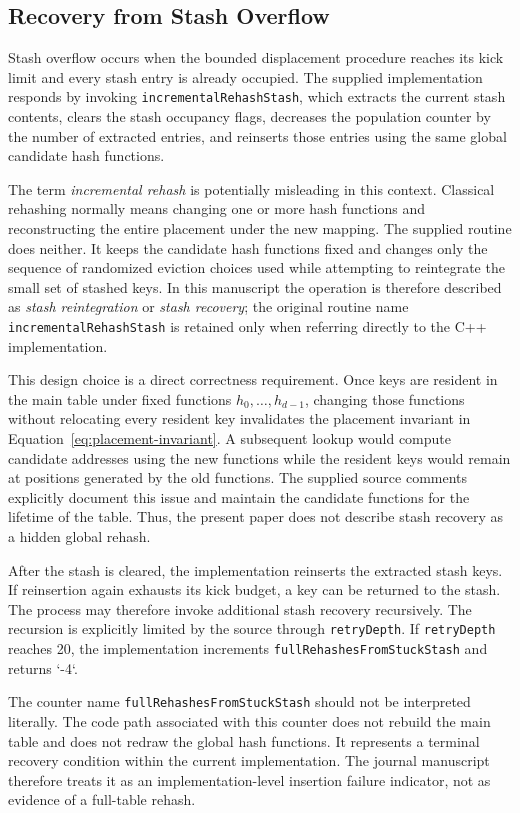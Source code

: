 \documentclass[conference]{IEEEtran}
\begin{document}
\subsection{Recovery from Stash Overflow}

Stash overflow occurs when the bounded displacement procedure reaches its kick limit and every stash entry is already occupied. The supplied implementation responds by invoking \texttt{incrementalRehashStash}, which extracts the current stash contents, clears the stash occupancy flags, decreases the population counter by the number of extracted entries, and reinserts those entries using the same global candidate hash functions.

The term \emph{incremental rehash} is potentially misleading in this context. Classical rehashing normally means changing one or more hash functions and reconstructing the entire placement under the new mapping. The supplied routine does neither. It keeps the candidate hash functions fixed and changes only the sequence of randomized eviction choices used while attempting to reintegrate the small set of stashed keys. In this manuscript the operation is therefore described as \emph{stash reintegration} or \emph{stash recovery}; the original routine name \texttt{incrementalRehashStash} is retained only when referring directly to the C++ implementation.

This design choice is a direct correctness requirement. Once keys are resident in the main table under fixed functions $h_0,\ldots,h_{d-1}$, changing those functions without relocating every resident key invalidates the placement invariant in Equation~\eqref{eq:placement-invariant}. A subsequent lookup would compute candidate addresses using the new functions while the resident keys would remain at positions generated by the old functions. The supplied source comments explicitly document this issue and maintain the candidate functions for the lifetime of the table. Thus, the present paper does not describe stash recovery as a hidden global rehash.

After the stash is cleared, the implementation reinserts the extracted stash keys. If reinsertion again exhausts its kick budget, a key can be returned to the stash. The process may therefore invoke additional stash recovery recursively. The recursion is explicitly limited by the source through \texttt{retryDepth}. If \texttt{retryDepth} reaches 20, the implementation increments \texttt{fullRehashesFromStuckStash} and returns `-4`.

The counter name \texttt{fullRehashesFromStuckStash} should not be interpreted literally. The code path associated with this counter does not rebuild the main table and does not redraw the global hash functions. It represents a terminal recovery condition within the current implementation. The journal manuscript therefore treats it as an implementation-level insertion failure indicator, not as evidence of a full-table rehash.
\end{document}

